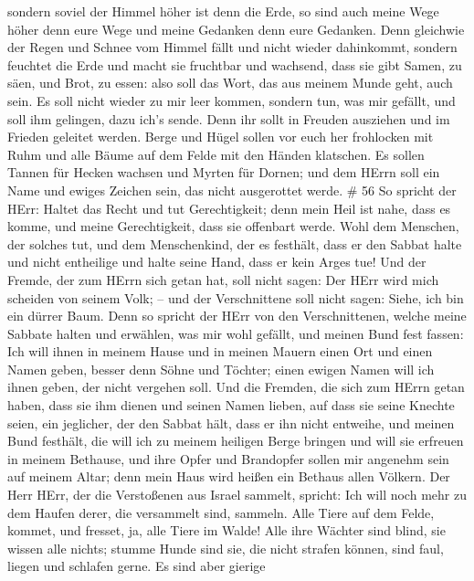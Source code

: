  sondern soviel der Himmel höher ist denn die Erde, so sind
auch meine Wege höher denn eure Wege und meine Gedanken denn eure
Gedanken.  Denn gleichwie der Regen und Schnee vom Himmel
fällt und nicht wieder dahinkommt, sondern feuchtet die Erde und macht
sie fruchtbar und wachsend, dass sie gibt Samen, zu säen, und Brot, zu
essen:  also soll das Wort, das aus meinem Munde geht, auch
sein. Es soll nicht wieder zu mir leer kommen, sondern tun, was mir
gefällt, und soll ihm gelingen, dazu ich's sende.  Denn ihr
sollt in Freuden ausziehen und im Frieden geleitet werden. Berge und
Hügel sollen vor euch her frohlocken mit Ruhm und alle Bäume auf dem
Felde mit den Händen klatschen.  Es sollen Tannen für
Hecken wachsen und Myrten für Dornen; und dem HErrn soll ein Name und
ewiges Zeichen sein, das nicht ausgerottet werde. \# 56  So
spricht der HErr: Haltet das Recht und tut Gerechtigkeit; denn mein Heil
ist nahe, dass es komme, und meine Gerechtigkeit, dass sie offenbart
werde.  Wohl dem Menschen, der solches tut, und dem
Menschenkind, der es festhält, dass er den Sabbat halte und nicht
entheilige und halte seine Hand, dass er kein Arges tue! 
Und der Fremde, der zum HErrn sich getan hat, soll nicht sagen: Der HErr
wird mich scheiden von seinem Volk; -- und der Verschnittene soll nicht
sagen: Siehe, ich bin ein dürrer Baum.  Denn so spricht der
HErr von den Verschnittenen, welche meine Sabbate halten und erwählen,
was mir wohl gefällt, und meinen Bund fest fassen:  Ich will
ihnen in meinem Hause und in meinen Mauern einen Ort und einen Namen
geben, besser denn Söhne und Töchter; einen ewigen Namen will ich ihnen
geben, der nicht vergehen soll.  Und die Fremden, die sich
zum HErrn getan haben, dass sie ihm dienen und seinen Namen lieben, auf
dass sie seine Knechte seien, ein jeglicher, der den Sabbat hält, dass
er ihn nicht entweihe, und meinen Bund festhält,  die will
ich zu meinem heiligen Berge bringen und will sie erfreuen in meinem
Bethause, und ihre Opfer und Brandopfer sollen mir angenehm sein auf
meinem Altar; denn mein Haus wird heißen ein Bethaus allen Völkern.
 Der Herr HErr, der die Verstoßenen aus Israel sammelt,
spricht: Ich will noch mehr zu dem Haufen derer, die versammelt sind,
sammeln.  Alle Tiere auf dem Felde, kommet, und fresset, ja,
alle Tiere im Walde!  Alle ihre Wächter sind blind, sie
wissen alle nichts; stumme Hunde sind sie, die nicht strafen können,
sind faul, liegen und schlafen gerne.  Es sind aber gierige
